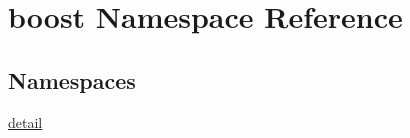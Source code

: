 \hypertarget{namespaceboost}{}\section{boost Namespace Reference}
\label{namespaceboost}
\subsection*{Namespaces}
\begin{DoxyCompactItemize}
\item 
 \mbox{\hyperlink{namespaceboost_1_1detail}{detail}}
\end{DoxyCompactItemize}
